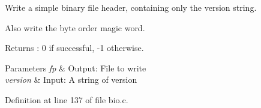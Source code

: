 Write a simple binary file header, containing only the version string. 

Also write the byte order magic word. \begin{DoxyReturn}{Returns}
\-: 0 if successful, -\/1 otherwise. 
\end{DoxyReturn}

\begin{DoxyParams}{Parameters}
{\em fp} & Output\-: File to write \\
\hline
{\em version} & Input\-: A string of version \\
\hline
\end{DoxyParams}


Definition at line 137 of file bio.\-c.

